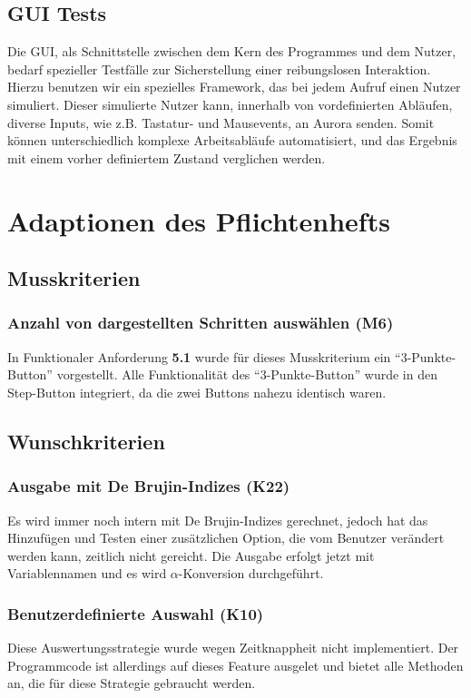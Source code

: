 \documentclass[parskip=full,11pt,twoside]{scrartcl}
\begin{document}
\subsection{GUI Tests}
Die GUI, als Schnittstelle zwischen dem Kern des Programmes und dem Nutzer, bedarf spezieller Testfälle zur Sicherstellung einer reibungslosen Interaktion.
Hierzu benutzen wir ein spezielles Framework, das bei jedem Aufruf einen Nutzer simuliert.
Dieser simulierte Nutzer kann, innerhalb von vordefinierten Abläufen, diverse Inputs, wie z.B. Tastatur- und Mausevents, an Aurora senden.
Somit können unterschiedlich komplexe Arbeitsabläufe automatisiert, und das Ergebnis mit einem vorher definiertem Zustand verglichen werden.



\section{Adaptionen des Pflichtenhefts}
\subsection{Musskriterien}

\subsubsection{Anzahl von dargestellten Schritten auswählen (M6)}
In Funktionaler Anforderung \textbf{5.1} wurde für dieses Musskriterium ein \enquote{3-Punkte-Button}
vorgestellt.
Alle Funktionalität des \enquote{3-Punkte-Button} wurde in den Step-Button integriert, da die zwei Buttons nahezu identisch waren. 

\subsection{Wunschkriterien}

\subsubsection{Ausgabe mit De Brujin-Indizes (K22)}
Es wird immer noch intern mit De Brujin-Indizes gerechnet, jedoch hat das Hinzufügen und Testen einer zusätzlichen Option,
die vom Benutzer verändert werden kann, zeitlich nicht gereicht.
Die Ausgabe erfolgt jetzt mit Variablennamen und es wird $\alpha$-Konversion durchgeführt.

\subsubsection{Benutzerdefinierte Auswahl (K10)}
Diese Auswertungsstrategie wurde wegen Zeitknappheit nicht implementiert.
Der Programmcode ist allerdings auf dieses Feature ausgelet und bietet
alle Methoden an, die für diese Strategie gebraucht werden.
\end{document}

